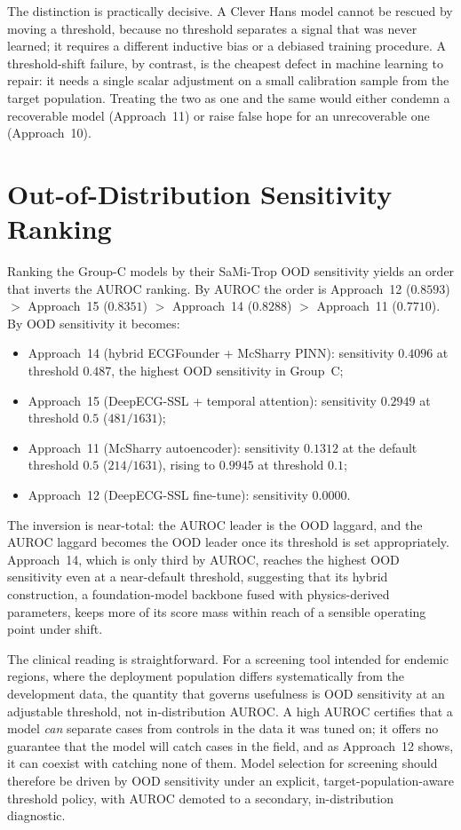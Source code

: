 The distinction is practically decisive. A Clever Hans model cannot be rescued by moving a threshold, because no threshold separates a signal that was never learned; it requires a different inductive bias or a debiased training procedure. A threshold-shift failure, by contrast, is the cheapest defect in machine learning to repair: it needs a single scalar adjustment on a small calibration sample from the target population. Treating the two as one and the same would either condemn a recoverable model (Approach~11) or raise false hope for an unrecoverable one (Approach~10).

\section{Out-of-Distribution Sensitivity Ranking}
\label{sec:ood_ranking}

Ranking the Group-C models by their SaMi-Trop OOD sensitivity yields an order that inverts the AUROC ranking. By AUROC the order is Approach~12 ($0.8593$) $>$ Approach~15 ($0.8351$) $>$ Approach~14 ($0.8288$) $>$ Approach~11 ($0.7710$). By OOD sensitivity it becomes:

\begin{itemize}
    \item Approach~14 (hybrid ECGFounder + McSharry PINN): sensitivity $0.4096$ at threshold $0.487$, the highest OOD sensitivity in Group~C;
    \item Approach~15 (DeepECG-SSL + temporal attention): sensitivity $0.2949$ at threshold $0.5$ ($481/1631$);
    \item Approach~11 (McSharry autoencoder): sensitivity $0.1312$ at the default threshold $0.5$ ($214/1631$), rising to $0.9945$ at threshold $0.1$;
    \item Approach~12 (DeepECG-SSL fine-tune): sensitivity $0.0000$.
\end{itemize}

The inversion is near-total: the AUROC leader is the OOD laggard, and the AUROC laggard becomes the OOD leader once its threshold is set appropriately. Approach~14, which is only third by AUROC, reaches the highest OOD sensitivity even at a near-default threshold, suggesting that its hybrid construction, a foundation-model backbone fused with physics-derived parameters, keeps more of its score mass within reach of a sensible operating point under shift.

The clinical reading is straightforward. For a screening tool intended for endemic regions, where the deployment population differs systematically from the development data, the quantity that governs usefulness is OOD sensitivity at an adjustable threshold, not in-distribution AUROC. A high AUROC certifies that a model \emph{can} separate cases from controls in the data it was tuned on; it offers no guarantee that the model will catch cases in the field, and as Approach~12 shows, it can coexist with catching none of them. Model selection for screening should therefore be driven by OOD sensitivity under an explicit, target-population-aware threshold policy, with AUROC demoted to a secondary, in-distribution diagnostic.

